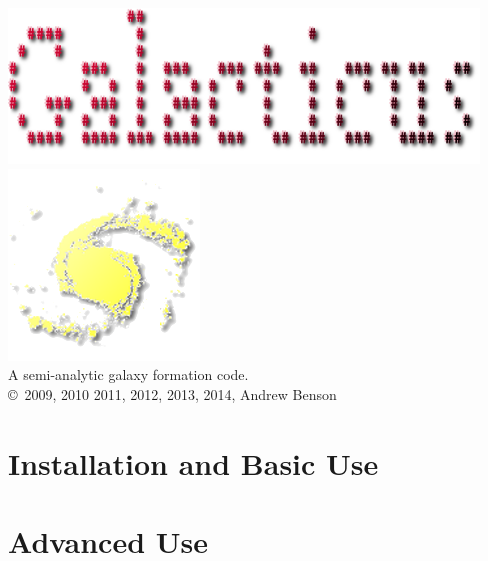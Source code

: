 \documentclass[letterpaper,10pt,headsepline]{scrbook}
\begin{document}
\lstset{language=[95]Fortran}

\frontmatter

\pagestyle{empty}
\begin{center}
\includegraphics[width=125mm]{GalacticusLogo.png}\\

\includegraphics{New_Logo_Galaxy_192_Transparent.png}\\
A semi-analytic galaxy formation code.\\

\copyright\ 2009, 2010 2011, 2012, 2013, 2014, Andrew Benson
\end{center}

\tableofcontents

\mainmatter
\pagestyle{headings}

\part{Installation and Basic Use}



















\part{Advanced Use}
\end{document}
